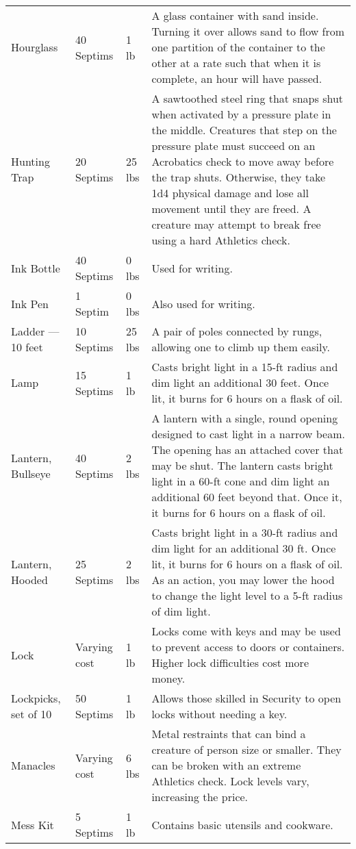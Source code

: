 {\begin{longtable}{p{}llp{}}
	Hourglass & 40 Septims & 1 lb & A glass container with sand inside. Turning it over allows sand to flow from one partition of the container to the other at a rate such that when it is complete, an hour will have passed.\\
	Hunting Trap & 20 Septims & 25 lbs & A sawtoothed steel ring that snaps shut when activated by a pressure plate in the middle. Creatures that step on the pressure plate must succeed on an Acrobatics check to move away before the trap shuts. Otherwise, they take 1d4 physical damage and lose all movement until they are freed. A creature may attempt to break free using a hard Athletics check.\\
	Ink Bottle & 40 Septims & 0 lbs & Used for writing.\\
	Ink Pen & 1 Septim & 0 lbs & Also used for writing.\\
	Ladder --- 10 feet & 10 Septims & 25 lbs & A pair of poles connected by rungs, allowing one to climb up them easily.\\
	Lamp & 15 Septims & 1 lb & Casts bright light in a 15-ft radius and dim light an additional 30 feet. Once lit, it burns for 6 hours on a flask of oil.\\
	Lantern, Bullseye & 40 Septims & 2 lbs & A lantern with a single, round opening designed to cast light in a narrow beam. The opening has an attached cover that may be shut. The lantern casts bright light in a 60-ft cone and dim light an additional 60 feet beyond that. Once it, it burns for 6 hours on a flask of oil.\\
	Lantern, Hooded & 25 Septims & 2 lbs & Casts bright light in a 30-ft radius and dim light for an additional 30 ft. Once lit, it burns for 6 hours on a flask of oil. As an action, you may lower the hood to change the light level to a 5-ft radius of dim light.\\
	Lock & Varying cost & 1 lb & Locks come with keys and may be used to prevent access to doors or containers. Higher lock difficulties cost more money.\\
	Lockpicks, set of 10 & 50 Septims & 1 lb & Allows those skilled in Security to open locks without needing a key.\\
	Manacles & Varying cost & 6 lbs & Metal restraints that can bind a creature of person size or smaller. They can be broken with an extreme Athletics check. Lock levels vary, increasing the price.\\
	Mess Kit & 5 Septims & 1 lb & Contains basic utensils and cookware.\\

\end{longtable}}
